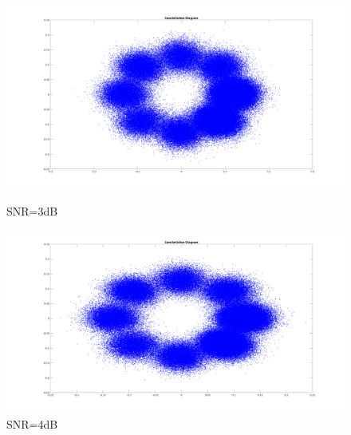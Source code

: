 \begin{spacing}{1.5}
\begin{figure}[H]
\begin{minipage}[t]{0.5\linewidth}
\centering
\includegraphics[width=0.9\columnwidth]{constellation9.png}
\caption{SNR=3dB}
\end{minipage}
\hfill
\begin{minipage}[t]{0.5\linewidth}
\centering
\includegraphics[width=0.9\columnwidth]{constellation10.png}
\caption{SNR=4dB}
\end{minipage}
\end{figure}



\end{spacing}

